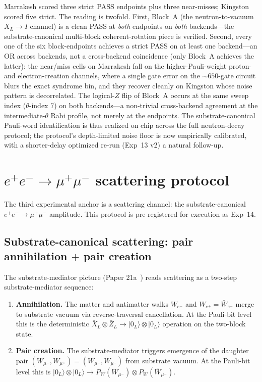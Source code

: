 \documentclass[11pt]{article}
\newcommand{\barX}{\bar X_L}
\newcommand{\barZ}{\bar Z_L}
\begin{document}
Marrakesh scored three strict PASS endpoints plus three near-misses; Kingston scored five strict.  The reading is twofold.  First, Block~A (the neutron-to-vacuum $\barX \to I$ channel) is a clean PASS at \emph{both} endpoints on \emph{both} backends---the substrate-canonical multi-block coherent-rotation piece is verified.  Second, every one of the six block-endpoints achieves a strict PASS on at least one backend---an OR across backends, not a cross-backend coincidence (only Block~A achieves the latter): the near/miss cells on Marrakesh fall on the higher-Pauli-weight proton- and electron-creation channels, where a single gate error on the $\sim 650$-gate circuit blurs the exact syndrome bin, and they recover cleanly on Kingston whose noise pattern is decorrelated.  The logical-$Z$ flip of Block~A occurs at the same sweep index ($\theta$-index $7$) on both backends---a non-trivial cross-backend agreement at the intermediate-$\theta$ Rabi profile, not merely at the endpoints.  The substrate-canonical Pauli-word identification is thus realized on chip across the full neutron-decay protocol; the protocol's depth-limited noise floor is now empirically calibrated, with a shorter-delay optimized re-run (Exp~13 v2) a natural follow-up.

\section{$e^+ e^- \to \mu^+ \mu^-$ scattering protocol}
\label{sec:emumu-scattering}

The third experimental anchor is a scattering channel: the substrate-canonical $e^+ e^- \to \mu^+ \mu^-$ amplitude.  This protocol is pre-registered for execution as Exp~14.

\subsection{Substrate-canonical scattering: pair annihilation $+$ pair creation}
\label{sec:emumu-theory}

The substrate-mediator picture (Paper 21a~\cite[\S 6, \S 9.3]{Paper21a}) reads scattering as a two-step substrate-mediator sequence:

\begin{enumerate}
\item \textbf{Annihilation.}  The matter and antimatter walks $W_{e^-}$ and $W_{e^+} = \bar W_{e^-}$ merge to substrate vacuum via reverse-traversal cancellation.  At the Pauli-bit level this is the deterministic $\barX \otimes \barZ \to |0_L\rangle \otimes |0_L\rangle$ operation on the two-block state.
\item \textbf{Pair creation.}  The substrate-mediator triggers emergence of the daughter pair $(W_{\mu^-}, W_{\mu^+}) = (W_{\mu^-}, \bar W_{\mu^-})$ from substrate vacuum.  At the Pauli-bit level this is $|0_L\rangle \otimes |0_L\rangle \to P_W(W_{\mu^-}) \otimes P_W(\bar W_{\mu^-})$.
\end{enumerate}
\end{document}
